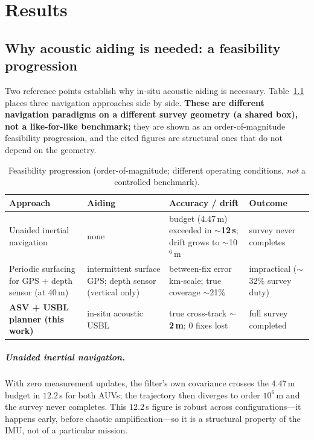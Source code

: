 \documentclass[12pt,a4paper,oneside]{book}
\newcommand{\tabref}[1]{Table~\ref{#1}}
\begin{document}
\chapter{Results}
\label{ch:results}

\section{Why acoustic aiding is needed: a feasibility progression}
\label{sec:feasibility}
Two reference points establish why in-situ acoustic aiding is necessary. \tabref{tab:progression} places
three navigation approaches side by side. \textbf{These are different navigation paradigms on a different
survey geometry (a shared box), not a like-for-like benchmark;} they are shown as an order-of-magnitude
feasibility progression, and the cited figures are structural ones that do not depend on the geometry.

\begin{table}[H]
\centering
\caption{Feasibility progression (order-of-magnitude; different operating conditions, \emph{not} a
controlled benchmark).}
\label{tab:progression}
\begin{tabular}{@{}p{3.4cm}p{3.0cm}p{3.4cm}p{3.2cm}@{}}
\toprule
Approach & Aiding & Accuracy / drift & Outcome \\
\midrule
Unaided inertial navigation & none & budget (4.47\,m) exceeded in \textbf{$\sim$12\,s}; drift grows to
$\sim$10$^6$\,m & survey never completes \\
Periodic surfacing for GPS + depth sensor (at 40\,m) & intermittent surface GPS; depth sensor (vertical
only) & between-fix error km-scale; true coverage $\sim$21\% & impractical ($\sim$32\% survey duty) \\
\textbf{ASV + USBL planner (this work)} & in-situ acoustic USBL & true cross-track $\sim$\textbf{2\,m};
0 fixes lost & full survey completed \\
\bottomrule
\end{tabular}
\end{table}

\paragraph{Unaided inertial navigation.} With zero measurement updates, the filter's own covariance crosses
the $4.47$\,m budget in $12.2$\,s for both AUVs; the trajectory then diverges to order $10^{6}$\,m and the
survey never completes. This $12.2$\,s figure is robust across configurations---it happens early, before
chaotic amplification---so it is a structural property of the IMU, not of a particular mission.
\end{document}
